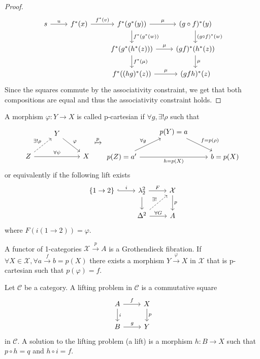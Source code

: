 \begin{proof}
	\[
	\begin{tikzcd}
		s 
		\ar[r, " u "]
		&
		f^* ( x ) 
		\ar[r, " f^* ( v ) "]
		&
		f^* ( g^* ( y ) )
		\ar[r," \mu "]
		\ar[d," f^* ( g^* ( w )) "]
		&
		( g \circ f )^* ( y ) 
		\ar[d, " { ( g \circ f )^*(w) } "]
		\\
		&&
		f^* ( g^* ( h^* ( z )))
		\ar[r, " \mu "]
		\ar[d," f^* ( \mu ) "]
		&
		( gf )^* (h^* ( z ))
		\ar[d, " \mu "]
		\\
		&&
		f^* (( h g )^*( z ) )
		\ar[r, "\mu"]
		&
		( g f h )^* ( z ) 
	\end{tikzcd}
	\]
	Since the squares commute by the associativity constraint, we get that both compositions are equal and thus the associativity constraint holds.
\end{proof}

\begin{defi}
\label{p-cartesian_defi}
	A morphism $ \varphi \colon Y \to X $ is called p-cartesian if $ \forall g ,  \exists! \rho $ such that 
	\[
	\begin{tikzcd}
		&
		Y
		\ar[rd, " \varphi " ]
		\\
		Z
		\ar[ru, dashed, " \exists! \rho "]
		\ar[rr, " \forall \psi" ]
		&&
		X
	\end{tikzcd}
	\xmapsto{ p }
	\begin{tikzcd}
		&
		p ( Y ) = a 
		\ar[rd, " f = p ( \rho ) " ]
		\\
		p ( Z ) = a'
		\ar[ru, " \forall g "]
		\ar[rr, " h = p ( X ) "' ]
		&&
		b = p ( X ) 
	\end{tikzcd}
	\]
	or equivalently if the following lift exists
	\[
	\begin{tikzcd}	
		\{ 1 \to 2 \}
		\ar[r, hook, " i " ]
		&
		\lambda^2_2
		\ar[r, " F "]
		\ar[d]
		&
		\mathcal{ X }
		\ar[d, " p "]
		\\
		&
		\Delta^2
		\ar[ru, dashed, "\exists ! "]
		\ar[r, " \forall G "]
		&
		A
	\end{tikzcd}
	\]
	where $ F ( i ( 1 \to 2 ) ) = \varphi $.
\end{defi}

\begin{defi}
	A functor of 1-categories $ \mathcal{ X } \xrightarrow{ p } A $ is a Grothendieck fibration.
	If $ \forall X \in \mathcal{ X } , \forall a \xrightarrow{ f } b = p ( X ) $ there exists a morphism $ Y \xrightarrow{ \varphi } X $ in $ \mathcal{ X } $ that is p-cartesian such that $ p ( \varphi ) = f $.
\end{defi}

\begin{defi}
	Let $ \mathcal{ C } $ be a category. 
	A lifting problem in $ \mathcal{ C } $ is a commutative square 
	\[
	\begin{tikzcd}
		A
		\ar[r, "f"]
		\ar[d, "i"]
		&
		X 
		\ar[d, "p"]
		\\
		B
		\ar[r, "g"]
		&
		Y
	\end{tikzcd}	
	\]
	in $ \mathcal{ C } $. 
	A solution to the lifting problem (a lift) is a morphism $ h \colon B \to X $ such that $ p \circ h = q $ and $ h \circ i = f $.
\end{defi}

